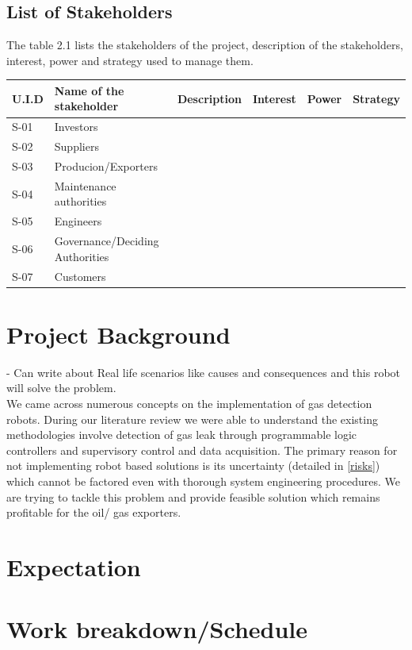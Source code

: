 \documentclass[a4paper]{article}
\begin{document}
\subsection{List of Stakeholders}
The table 2.1 lists the stakeholders of the project, description of the stakeholders, interest, power and strategy used to manage them.\\
\begin{adjustbox}{max width = \textwidth}
\begin{tabular}{ |l|l|l|l|l|l|  }
 \hline
 U.I.D     & Name of the stakeholder &Description&Interest&Power&Strategy\\
 \hline
 S-01   & Investors    &&&&\\
 S-02   &Suppliers  &&&&\\
 S-03 &Producion/Exporters &&&&\\
 S-04    &Maintenance authorities &&&&\\
S-05&   Engineers  &&&&\\
 S-06& Governance/Deciding Authorities &&&&\\
 S-07& Customers&&&&\\
 \hline
\end{tabular}
\end{adjustbox}
\section {Project Background}
 - Can write about Real life scenarios like causes and consequences and this robot will solve the problem.\bigskip \\ 
 We came across numerous concepts on the implementation of gas detection robots. During our literature review we were able to understand the existing methodologies involve detection of gas leak through programmable logic controllers  and supervisory control and data acquisition. The primary reason for not implementing robot based solutions is its uncertainty (detailed in \ref{risks}) which cannot be factored even with thorough system engineering procedures. We are trying to tackle this problem and provide feasible solution which remains profitable for the oil/ gas exporters.  
\section{Expectation}

\section{Work breakdown/Schedule}
\end{document}
